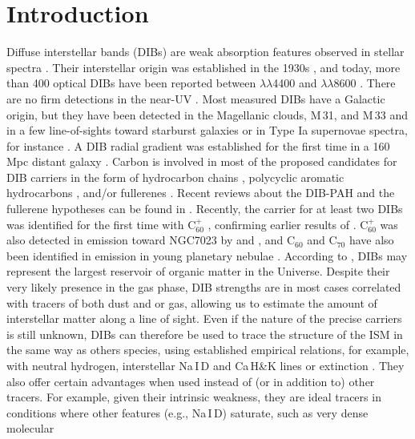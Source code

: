 \documentclass[printer]{aa} %
\begin{document}
\section{Introduction}
Diffuse interstellar bands (DIBs) are weak absorption features observed in stellar spectra \citep[see][for a review]{Herbig95,Sarre06}. Their interstellar origin was established in the 1930s \citep[see][for a historical review]{McCall13}, and today, more than 400 optical DIBs have been 
reported between $\lambda\lambda$4400 and $\lambda\lambda$8600  \citep[e.g.,][]{jenniskens94, Galazutdinov00, Hobbs09}. There are no firm detections in the near-UV \citep{Bhatt15}. Most measured DIBs have a Galactic origin, but they have been detected in the Magellanic clouds, M\,31, and M\,33 \citep{Welty06,Cordiner08a,Cordiner08b,Ehrenfreund02,Cordiner11,vanLoon13} and in a few line-of-sights toward starburst galaxies or in Type Ia supernovae spectra, for instance \citep{Heckman00,Sollerman05,Cox08,Phillips13}. A DIB radial gradient was established for the first time in a 160 Mpc distant galaxy \citep{MonrealIbero15}. 
Carbon is involved in most of the proposed candidates for DIB carriers in the form of hydrocarbon chains \cite[e.g.,][]{Maier04}, polycyclic aromatic hydrocarbons \citep[PAHs, e.g.,][]{Vanderzwet85,Leger85,Crawford85,Salama96,Kokkin08}, and/or fullerenes \citep[][]{IglesiasGroth07,Sassara01}. Recent reviews about the DIB-PAH and the fullerene hypotheses can be found in \cite{Cox11,Omont16}. Recently, the carrier for at least two DIBs was identified for the first time with C$_{60}^+$ \citep{Campbell15,Walker15,Campbell16}, confirming earlier results of \cite{Foing94}. C$_{60}^+$ was also detected in emission toward NGC7023 by \cite{Berne13} and \cite{Sellgren10}, and C$_{60}$ and C$_{70}$ have also been identified in emission in young planetary nebulae \citep{Cami10}. According to \cite{Snow14}, DIBs may represent the largest reservoir of organic matter in the Universe.
Despite their very likely presence in the gas phase, DIB strengths are in most cases correlated with tracers of both dust and or gas, allowing us to estimate the amount of interstellar matter along a line of sight. Even if the nature of the precise carriers is still unknown, DIBs can therefore be used to trace the structure of the ISM in the same way as others species, using established empirical relations, for example, with neutral hydrogen, interstellar Na\,I\,D and Ca\,H\&K lines or extinction \citep[e.g.,][]{Herbig93,Friedman11}. They also offer certain advantages when used instead of (or in addition to) other tracers. For example, given their intrinsic weakness, they are ideal tracers in conditions where other features (e.g., Na\,I\,D) saturate, such as very dense molecular 
\end{document}

